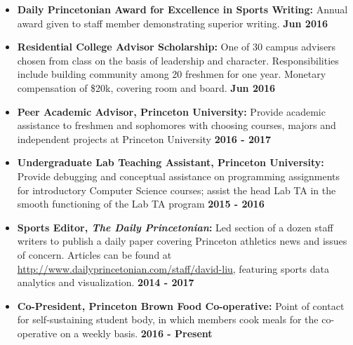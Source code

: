 \documentclass[margin]{res}
\begin{document}
\begin{resume}
\begin{itemize}
\item
{\bf {Daily Princetonian Award for Excellence in Sports Writing:}} Annual award given to staff member demonstrating superior writing. {\bf \hfill Jun 2016}

\item
{\bf {Residential College Advisor Scholarship:}} One of 30 campus advisers chosen from class on the basis of leadership and character. Responsibilities include building community among 20 freshmen for one year. Monetary compensation of \$20k, covering room and board. {\bf \hfill Jun 2016}

\end{itemize}

\begin{itemize}
\section {Co-curricular Activities}
\item
{\bf {Peer Academic Advisor, Princeton University:}} Provide academic assistance to freshmen and sophomores with choosing courses, majors and independent projects at Princeton University {\bf \hfill 2016 - 2017}
\item
{\bf {Undergraduate Lab Teaching Assistant, Princeton University:}} Provide debugging and conceptual assistance on programming assignments for introductory Computer Science courses; assist the head Lab TA in the smooth functioning of the Lab TA program {\bf \hfill 2015 - 2016}
\end{itemize}

\begin{itemize}
\section {Extracurricular Activities}
\item
{\bf {Sports Editor, \textit{The Daily Princetonian}:}} Led section of a dozen staff writers to publish a daily paper covering Princeton athletics news and issues of concern. Articles can be found at \url{http://www.dailyprincetonian.com/staff/david-liu}, featuring sports data analytics and visualization.  {\bf \hfill 2014 - 2017}

\item
{\bf {Co-President, Princeton Brown Food Co-operative:}} Point of contact for self-sustaining student body, in which members cook meals for the co-operative on a weekly basis.  {\bf \hfill 2016 - Present}
\end{itemize}



\end{resume}
\end{document}
